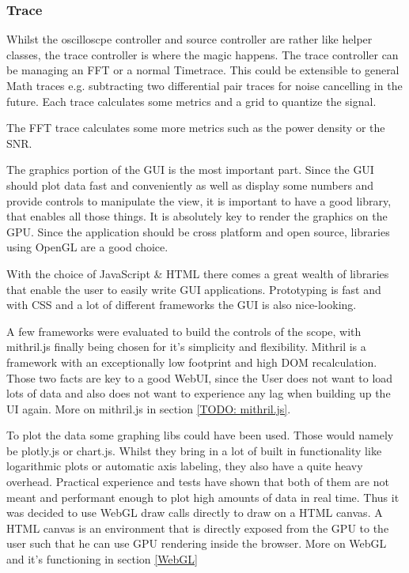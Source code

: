 \subsubsection*{Trace}

Whilst the oscilloscpe controller and source controller are rather like helper classes, the trace controller is where the magic happens.
The trace controller can be managing an FFT or a normal Timetrace. This could be extensible to general Math traces e.g. subtracting two differential pair traces for noise cancelling in the future.
Each trace calculates some metrics and a grid to quantize the signal.

The FFT trace calculates some more metrics such as the power density or the SNR.

The graphics portion of the GUI is the most important part. Since the GUI should plot data fast and conveniently as well as display some numbers and provide controls to manipulate the view, it is important to have a good library, that enables all those things. It is absolutely key to render the graphics on the GPU. Since the application should be cross platform and open source, libraries using OpenGL are a good choice.

With the choice of JavaScript \& HTML there comes a great wealth of libraries that enable the user to easily write GUI applications. Prototyping is fast and with CSS and a lot of different frameworks the GUI is also nice-looking.

A few frameworks were evaluated to build the controls of the scope, with mithril.js finally being chosen for it's simplicity and flexibility. Mithril is a framework with an exceptionally low footprint and high DOM recalculation.
Those two facts are key to a good WebUI, since the User does not want to load lots of data and also does not want to experience any lag when building up the UI again.
More on mithril.js in section \ref{TODO: mithril.js}.

To plot the data some graphing libs could have been used. Those would namely be plotly.js or chart.js. Whilst they bring in a lot of built in functionality like logarithmic plots or automatic axis labeling, they also have a quite heavy overhead.
Practical experience and tests have shown that both of them are not meant and performant enough to plot high amounts of data in real time.
Thus it was decided to use WebGL draw calls directly to draw on a HTML canvas. A HTML canvas is an environment that is directly exposed from the GPU to the user such that he can use GPU rendering inside the browser.
More on WebGL and it's functioning in section \ref{WebGL}

